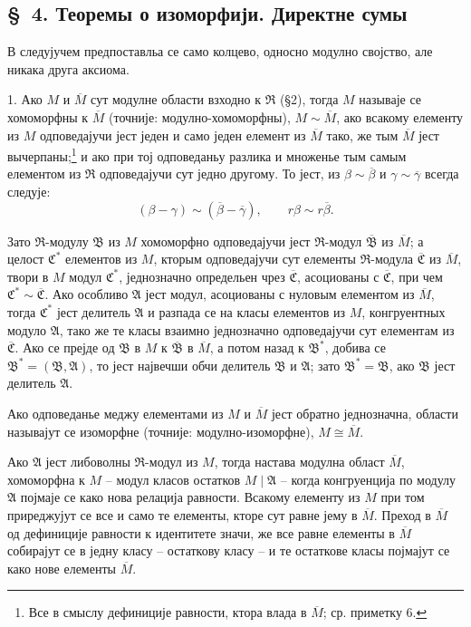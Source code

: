 \documentclass[11pt]{article}
\providecommand{\mR}{\mathfrak{R}}
\providecommand{\mA}{\mathfrak{A}}
\providecommand{\mB}{\mathfrak{B}}
\providecommand{\mC}{\mathfrak{C}}
\begin{document}
\setcounter{footnote}{14}

\subsection*{\S~4. Теоремы о изоморфији. Директне сумы}

В следујучем предпоставльа се само колцево, односно модулно својство, але никака друга аксиома.

1. Ако $M$ и $\overline M$ сут модулне области взходно к $\mR$ (§2), тогда $M$ называје се хомоморфны к $\overline M$ (точније: модулно-хомоморфны), $M\sim\overline M$, ако всакому елементу из $M$ одповедајучи јест једен и само једен елемент из $\overline M$ тако, же тым $\overline M$ јест вычерпаны;\footnote{Все в смыслу дефиниције равности, ктора влада в $\overline M$; ср. приметку 6.} и ако при тој одповеданьу разлика и множенье тым самым елементом из $\mR$ одповедајучи сут једно другому. То јест, из $\beta\sim\overline\beta$ и $\gamma\sim\overline\gamma$ всегда следује:
\[
(\beta-\gamma)\sim(\overline\beta-\overline\gamma),\qquad r\beta\sim r\overline\beta .
\]

Зато $\mR$-модулу $\mB$ из $M$ хомоморфно одповедајучи јест $\mR$-модул $\overline{\mB}$ из $\overline M$; а целост $\mC^*$ елементов из $M$, кторым одповедајучи сут елементы $\mR$-модула $\overline{\mC}$ из $\overline M$, твори в $M$ модул $\mC^*$, једнозначно определьен чрез $\overline{\mC}$, асоциованы с $\overline{\mC}$, при чем $\mC^*\sim\overline{\mC}$. Ако особливо $\mA$ јест модул, асоциованы с нуловым елементом из $\overline M$, тогда $\mC^*$ јест делитель $\mA$ и разпада се на класы елементов из $M$, конгруентных модуло $\mA$, тако же те класы взаимно једнозначно одповедајучи сут елементам из $\overline{\mC}$. Ако се прејде од $\mB$ в $M$ к $\overline{\mB}$ в $\overline M$, а потом назад к $\mB^*$, добива се $\mB^*=(\mB,\mA)$, то јест највечши обчи делитель $\mB$ и $\mA$; зато $\mB^*=\mB$, ако $\mB$ јест делитель $\mA$.

Ако одповеданье меджу елементами из $M$ и $\overline M$ јест обратно једнозначна, области называјут се изоморфне (точније: модулно-изоморфне), $M\cong\overline M$.

Ако $\mA$ јест либоволны $\mR$-модул из $M$, тогда настава модулна област $\overline M$, хомоморфна к $M$ -- модул класов остатков $M\mid\mA$ -- когда конгруенција по модулу $\mA$ појмаје се како нова релација равности. Всакому елементу из $M$ при том приреджујут се все и само те елементы, кторе сут равне јему в $\overline M$. Преход в $\overline M$ од дефиниције равности к идентитете значи, же все равне елементы в $\overline M$ собирајут се в једну класу -- остаткову класу -- и те остаткове класы појмајут се како нове елементы $\overline M$.
\end{document}
